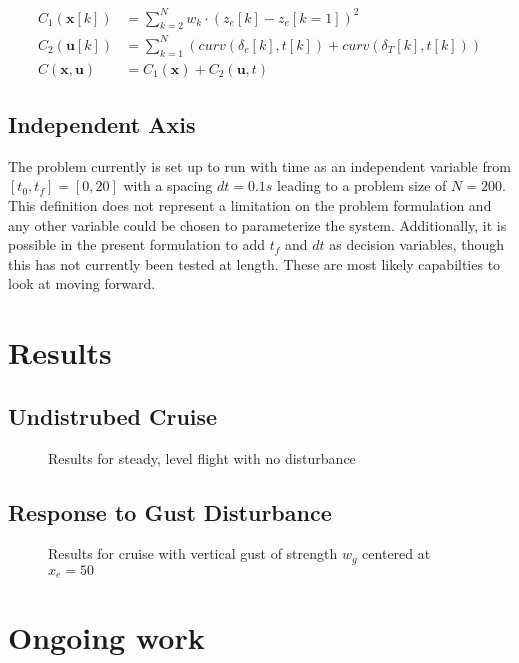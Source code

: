 \documentclass{article}
\begin{document}
\begin{align} 
	C_1(\mathbf{x}[k]) &= \sum_{k=2}^{N} w_k \cdot(z_e[k] - z_e[k=1])^2  \label{eq:altitude-cost}\\ 
	C_2(\mathbf{u}[k]) &= \sum_{k=1}^{N}{ \left(curv(\delta_e[k], t[k]) + curv(\delta_T[k], t[k]) \right) }\label{eq:curvature-cost}\\
	C(\mathbf{x},\mathbf{u}) &= C_1(\mathbf{x}) + C_2(\mathbf{u},t) \label{eq:total-cost}
	\end{align}


\subsection{Independent Axis} \label{sec:problem-grid}
The problem currently is set up to run with time as an independent variable from $[t_0, t_f] = [0,20]$ with a spacing $dt = 0.1s$ leading to a problem size of $N=200$.  
This definition does not represent a limitation on the problem formulation and any other variable could be chosen to parameterize the system. 
Additionally, it is possible in the present formulation to add $t_f$ and $dt$ as decision variables, though this has not currently been tested at length. 
These are most likely capabilties to look at moving forward.

\section{Results}
\subsection{Undistrubed Cruise}
\begin{figure}
	\caption{Results for steady, level flight with no disturbance}
	\label{fig:steady-level}
\end{figure}

\subsection{Response to Gust Disturbance}
\begin{figure}
	\caption{Results for cruise with vertical gust of strength $w_g$ centered at $x_e = 50$}
	\label{fig:gust-parameter-sweep}
\end{figure}

\section{Ongoing work}
\end{document}
